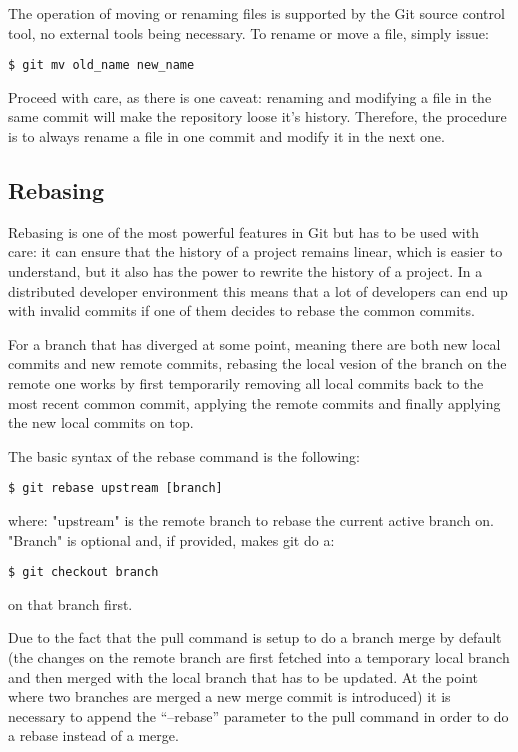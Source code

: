 \documentclass[10p]{article}
\theoremstyle{definition}
\begin{document}
The operation of moving or renaming files is supported by the Git source control tool, no external tools being necessary. To rename or move a file, simply issue:

\begin{lstlisting}
$ git mv old_name new_name
\end{lstlisting}

Proceed with care, as there is one caveat: renaming and modifying a file in the same commit will make the repository loose it's history. Therefore, the procedure is to always rename a file in one commit and modify it in the next one.


\subsection*{Rebasing}

Rebasing is one of the most powerful features in Git but has to be used with care: it can ensure that the history of a project remains linear, which is easier to understand, but it also has the power to rewrite the history of a project. In a distributed developer environment this means that a lot of developers can end up with invalid commits if one of them decides to rebase the common commits.

For a branch that has diverged at some point, meaning there are both new local commits and new remote commits, rebasing the local vesion of the branch on the remote one works by first temporarily removing all local commits back to the most recent common commit, applying the remote commits and finally applying the new local commits on top.

The basic syntax of the rebase command is the following:

\begin{lstlisting}
$ git rebase upstream [branch]
\end{lstlisting}

where: "upstream" is the remote branch to rebase the current active branch on. "Branch" is optional and, if provided, makes git do a:

\begin{lstlisting}
$ git checkout branch
\end{lstlisting}

on that branch first.

Due to the fact that the pull command is setup to do a branch merge by default (the changes on the remote branch are first fetched into a temporary local branch and then merged with the local branch that has to be updated. At the point where two branches are merged a new merge commit is introduced) it is necessary to append the ``--rebase'' parameter to the pull command in order to do a rebase instead of a merge.
\end{document}
